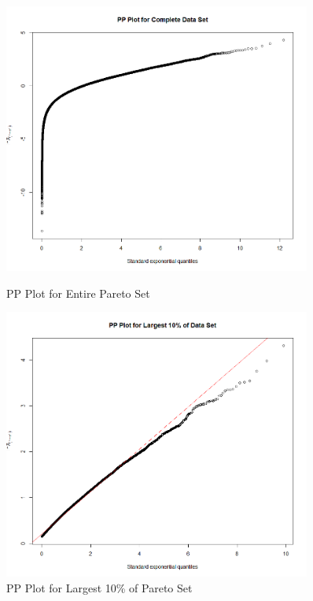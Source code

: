 \documentclass[letterpaper,12pt,titlepage,oneside,final]{book}
\begin{document}
	
	\begin{figure}
		\centering
		\begin{minipage}{0.45\textwidth}
			\centering
			\includegraphics[width=0.9\textwidth]{ParWhole}
			\caption{PP Plot for Entire Pareto Set}
			\label{fig: ParWhole}
		\end{minipage}\hfill
		\begin{minipage}{0.45\textwidth}
			\centering
			\includegraphics[width=0.9\textwidth]{Pare10}
			\caption{PP Plot for Largest 10\% of Pareto Set}
			\label{fig: Pare10}
		\end{minipage}
	\end{figure}
\end{document}
